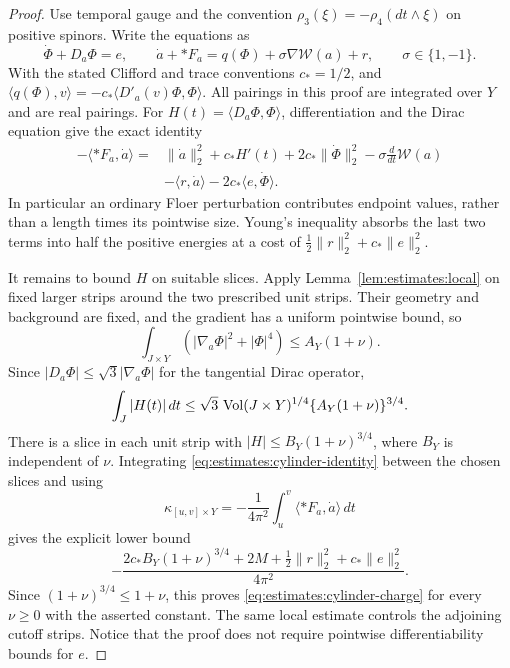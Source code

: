 \begin{proof}
Use temporal gauge and the convention
$\rho_3(\xi)=-\rho_4(dt\wedge\xi)$ on positive spinors.  Write the
equations as
\[
 \dot\Phi+D_a\Phi=e,\qquad
 \dot a+*F_a=q(\Phi)+\sigma\nabla\mathcal W(a)+r,
 \qquad \sigma\in\{1,-1\}.
\]
With the stated Clifford and trace conventions $c_*=1/2$, and
$\langle q(\Phi),v\rangle=-c_*\langle D'_a(v)\Phi,\Phi\rangle$.
All pairings in this proof are integrated over $Y$ and are real
pairings.  For $H(t)=\langle D_a\Phi,\Phi\rangle$, differentiation
and the Dirac equation give the exact identity
\begin{equation}
 \begin{split}
 -\langle *F_a,\dot a\rangle
 ={}&\|\dot a\|_2^2+c_*H'(t)+2c_*\|\dot\Phi\|_2^2
       -\sigma\frac{d}{dt}\mathcal W(a)\\
    &-\langle r,\dot a\rangle-2c_*\langle e,\dot\Phi\rangle.
 \end{split}
 \label{eq:estimates:cylinder-identity}
\end{equation}
In particular an ordinary Floer perturbation contributes endpoint
values, rather than a length times its pointwise size.  Young's
inequality absorbs the last two terms into half the positive energies
at a cost of $\frac12\|r\|_2^2+c_*\|e\|_2^2$.

It remains to bound $H$ on suitable slices.  Apply
Lemma~\ref{lem:estimates:local} on fixed larger strips around the two
prescribed unit strips.  Their geometry and background are fixed, and
the gradient has a uniform pointwise bound, so
\[
 \int_{J\times Y}(|\nabla_a\Phi|^2+|\Phi|^4)\leq A_Y(1+\nu).
\]
Since $|D_a\Phi|\leq\sqrt3|\nabla_a\Phi|$ for the tangential Dirac
operator,
\[
 \int_J|H(t)|\,dt
 \leq\sqrt3\,\operatorname{Vol}(J\times Y)^{1/4}
          \{A_Y(1+\nu)\}^{3/4}.
\]
There is a slice in each unit strip with
$|H|\leq B_Y(1+\nu)^{3/4}$, where $B_Y$ is independent of $\nu$.
Integrating
\eqref{eq:estimates:cylinder-identity} between the chosen slices and
using
\[
 \kappa_{[u,v]\times Y}
       =-\frac1{4\pi^2}\int_u^v\langle *F_a,\dot a\rangle\,dt
\]
gives the explicit lower bound
\[
 -\frac{2c_*B_Y(1+\nu)^{3/4}+2M+
             \frac12\|r\|_2^2+c_*\|e\|_2^2}{4\pi^2}.
\]
Since $(1+\nu)^{3/4}\leq1+\nu$, this proves
\eqref{eq:estimates:cylinder-charge} for every $\nu\geq0$ with the
asserted constant.  The same local
estimate controls the adjoining cutoff strips.  Notice that the
proof does not require pointwise differentiability bounds for $e$.
\end{proof}

